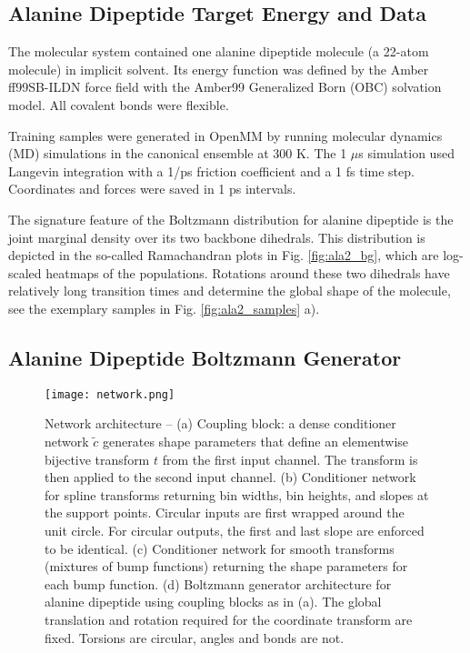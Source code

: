 \documentclass{article}
\newcommand{\jonas}[1]{{\color{red} \textbf{jonas:} #1}}
\begin{document}
\subsection{Alanine Dipeptide Target Energy and Data}
\label{sec:ala2}
The molecular system contained one alanine dipeptide molecule (a 22-atom molecule) in implicit solvent. Its energy function was defined by the Amber ff99SB-ILDN force field with the Amber99 Generalized Born (OBC) solvation model. All covalent bonds were flexible.

Training samples were generated in OpenMM by running molecular dynamics (MD) simulations in the canonical ensemble at 300 K. The 1 $\mu$s simulation used Langevin integration with a 1/ps friction coefficient and a 1 fs time step. Coordinates and forces were saved in 1 ps intervals. 


The signature feature of the Boltzmann distribution for alanine dipeptide is the joint marginal density over its two backbone dihedrals. This distribution is depicted in the so-called Ramachandran plots in Fig. \ref{fig:ala2_bg}, which are log-scaled heatmaps of the populations. Rotations around these two dihedrals have relatively long transition times and determine the global shape of the molecule, see the exemplary samples in Fig. \ref{fig:ala2_samples} a).


\subsection{Alanine Dipeptide Boltzmann Generator}
\label{sec:ala2bg}

\begin{figure}
    \centering
    \texttt{[image: network.png]}
    \caption{Network architecture -- (a) Coupling block: a dense conditioner network $\tilde{c}$ generates shape parameters that define an elementwise bijective transform $t$ from the first input channel. The transform is then applied to the second input channel. (b) Conditioner network for spline transforms returning bin widths, bin heights, and slopes at the support points. Circular inputs are first wrapped around the unit circle. For circular outputs, the first and last slope are enforced to be identical. (c) Conditioner network for smooth transforms (mixtures of bump functions) returning the shape parameters for each bump function. (d) Boltzmann generator architecture for alanine dipeptide using coupling blocks as in (a). The global translation and rotation required for the coordinate transform are fixed. Torsions are circular, angles and bonds are not.}
    \label{fig:network}
\end{figure}
\end{document}
